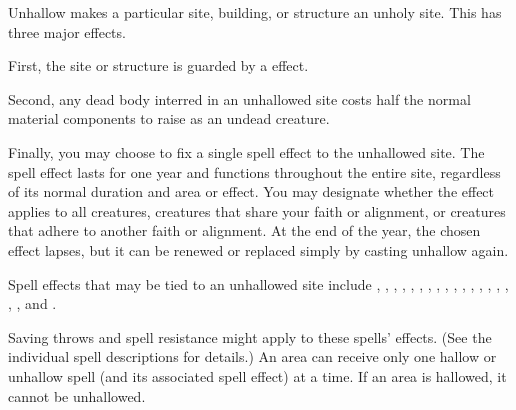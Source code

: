 \spelleffect Unhallow makes a particular site, building, or structure an unholy site. This has three major effects.
\par First, the site or structure is guarded by a  effect.
\par Second, any dead body interred in an unhallowed site costs half the normal material components to raise as an undead creature.
\par Finally, you may choose to fix a single spell effect to the unhallowed site. The spell effect lasts for one year and functions throughout the entire site, regardless of its normal duration and area or effect. You may designate whether the effect applies to all creatures, creatures that share your faith or alignment, or creatures that adhere to another faith or alignment. At the end of the year, the chosen effect lapses, but it can be renewed or replaced simply by casting unhallow again.
\par Spell effects that may be tied to an unhallowed site include , , , , , , , , , , , , , , , , , , and .
\par Saving throws and spell resistance might apply to these spells' effects. (See the individual spell descriptions for details.)
\spellnotes An area can receive only one hallow or unhallow spell (and its associated spell effect) at a time. If an area is hallowed, it cannot be unhallowed.

